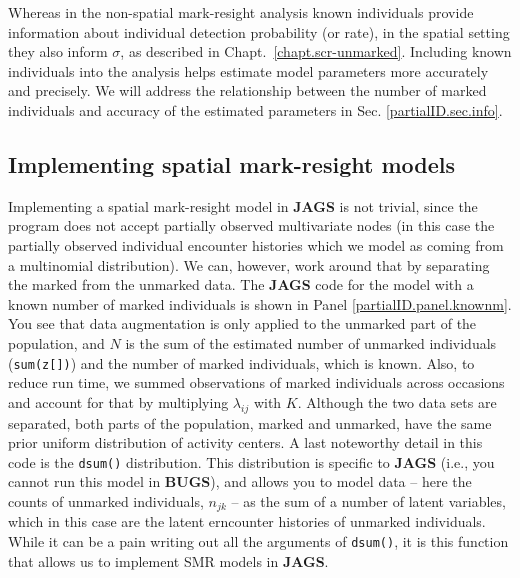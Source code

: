 Whereas in the non-spatial mark-resight analysis known individuals
provide information about individual detection probability (or
rate), in the spatial setting they
also inform $\sigma$, as described in
Chapt.~\ref{chapt.scr-unmarked}. Including known individuals into the
analysis helps estimate
model parameters more accurately and precisely. We will address the
relationship between the number of marked individuals and accuracy of
the estimated parameters in Sec. \ref{partialID.sec.info}.


\subsection{Implementing spatial mark-resight models}
Implementing a spatial mark-resight model in {\bf JAGS} is not
trivial, since the program does not accept partially observed
multivariate nodes (in this case the partially observed individual
encounter histories which we model as coming from a multinomial
distribution). 
We can, however, work around that by separating the marked from the unmarked data. The {\bf JAGS} code for the model with a known number of marked individuals is shown in Panel \ref{partialID.panel.knownm}. You see that data augmentation is only applied to the unmarked part of the population, and $N$ is the sum of the estimated number of unmarked individuals ({\tt sum(z[])}) and the number of marked individuals, which is known. Also, to reduce run time, we summed observations of marked individuals across occasions and account for that by multiplying $\lambda_{ij}$ with $K$. Although the two data sets are separated, both parts of the population, marked and unmarked, have the same prior uniform distribution of activity centers.
A last noteworthy detail in this code is the {\tt dsum()}
distribution. 
This distribution 
is specific to {\bf JAGS} (i.e., you cannot run this model in {\bf
  BUGS}), and allows you to model data -- here the counts of unmarked
individuals, $n_{jk}$ -- as the sum of a number of latent variables,
which in this case are
the latent erncounter histories of unmarked individuals. While it can be a pain writing out all the arguments of {\tt dsum()}, it is this function that allows us to implement SMR models in {\bf JAGS}.


